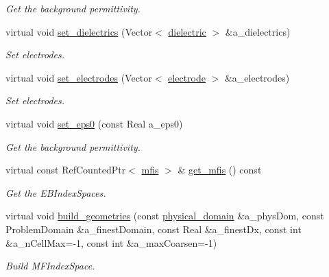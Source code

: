 \begin{DoxyCompactItemize}
\begin{DoxyCompactList}\small\item\em Get the background permittivity. \end{DoxyCompactList}\item 
virtual void \hyperlink{classcomputational__geometry_ab40b0b0408177a423f7a470ce87e3a96}{set\+\_\+dielectrics} (Vector$<$ \hyperlink{classdielectric}{dielectric} $>$ \&a\+\_\+dielectrics)
\begin{DoxyCompactList}\small\item\em Set electrodes. \end{DoxyCompactList}\item 
virtual void \hyperlink{classcomputational__geometry_a3fa9b871951b6b3dcff6378e93d60994}{set\+\_\+electrodes} (Vector$<$ \hyperlink{classelectrode}{electrode} $>$ \&a\+\_\+electrodes)
\begin{DoxyCompactList}\small\item\em Set electrodes. \end{DoxyCompactList}\item 
virtual void \hyperlink{classcomputational__geometry_aecda7065a57863506d655e84e70fef7f}{set\+\_\+eps0} (const Real a\+\_\+eps0)
\begin{DoxyCompactList}\small\item\em Get the background permittivity. \end{DoxyCompactList}\item 
virtual const Ref\+Counted\+Ptr$<$ \hyperlink{classmfis}{mfis} $>$ \& \hyperlink{classcomputational__geometry_a8e7da56b599a59a8f05f59bf0180a839}{get\+\_\+mfis} () const 
\begin{DoxyCompactList}\small\item\em Get the E\+B\+Index\+Spaces. \end{DoxyCompactList}\item 
virtual void \hyperlink{classcomputational__geometry_a5a3cf754b07596074b0a717cd309b3e6}{build\+\_\+geometries} (const \hyperlink{classphysical__domain}{physical\+\_\+domain} \&a\+\_\+phys\+Dom, const Problem\+Domain \&a\+\_\+finest\+Domain, const Real \&a\+\_\+finest\+Dx, const int \&a\+\_\+n\+Cell\+Max=-\/1, const int \&a\+\_\+max\+Coarsen=-\/1)
\begin{DoxyCompactList}\small\item\em Build M\+F\+Index\+Space. \end{DoxyCompactList}\end{DoxyCompactItemize}
